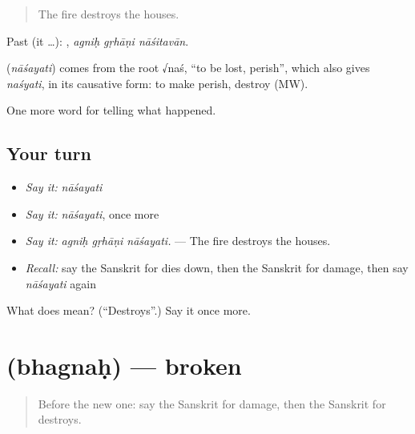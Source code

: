 \begin{quote}
The fire destroys the houses.
\end{quote}

Past (it …):   , \emph{agniḥ gṛhāṇi nāśitavān}.

\begin{cousinweb}
\textbf{} (\emph{nāśayati}) comes from the root √naś, \textquotedblleft{}to be lost, perish\textquotedblright{}, which also gives \emph{naśyati}, in its causative form: to make perish, destroy (MW).
\end{cousinweb}

\begin{grammarlens}[title={What you've built}]
One more word for telling what happened.
\end{grammarlens}

\subsection*{Your turn}
\begin{itemize}
\raggedright
  \item \emph{Say it:} \emph{nāśayati}
  \item \emph{Say it:} \emph{nāśayati}, once more
  \item \emph{Say it:} \emph{agniḥ gṛhāṇi nāśayati.} — The fire destroys the houses.
  \item \emph{Recall:} say the Sanskrit for dies down, then the Sanskrit for damage, then say \emph{nāśayati} again
\end{itemize}

\begin{tcolorbox}[breakable,colback=teal!4,colframe=teal!35!black,title={Before you move on}]
What does  mean? (\textquotedblleft{}Destroys\textquotedblright{}.) Say it once more.
\end{tcolorbox}
\section[\texorpdfstring{\sk{भग्नः} (bhagnaḥ)}{भग्नः (bhagnaḥ)}]{ (bhagnaḥ) — broken}

\label{lesson:SA-C298-bhagnah}



\begin{quote}
Before the new one: say the Sanskrit for damage, then the Sanskrit for destroys.
\end{quote}

